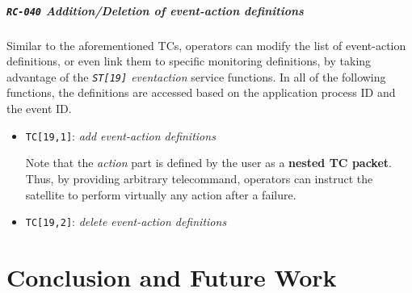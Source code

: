 \documentclass[a4paper,nobib]{tufte-book}
\begin{document}
	\paragraph{\textbf{\texttt{RC-040} Addition/Deletion of event-action definitions}}\hspace{0pt}
	
	Similar to the aforementioned \acsp{TC}, operators can modify the list of event-action definitions, or even link them to specific monitoring definitions, by taking advantage of the \emph{\texttt{ST[19]} eventaction} service functions. In all of the following functions, the definitions are accessed based on the application process ID and the event ID.
	

		
	\begin{itemize}
		\item \texttt{TC[19,1]}: \emph{add event-action definitions}
		
		Note that the \emph{action} part is defined by the user as a \textbf{nested \acs{TC} packet}. Thus, by providing arbitrary telecommand, operators can instruct the satellite to perform virtually any action after a failure.
		
		\item \texttt{TC[19,2]}: \emph{delete event-action definitions}
		
	\end{itemize}


\chapter{Conclusion and Future Work}
\label{cap:conclusion}
\end{document}
